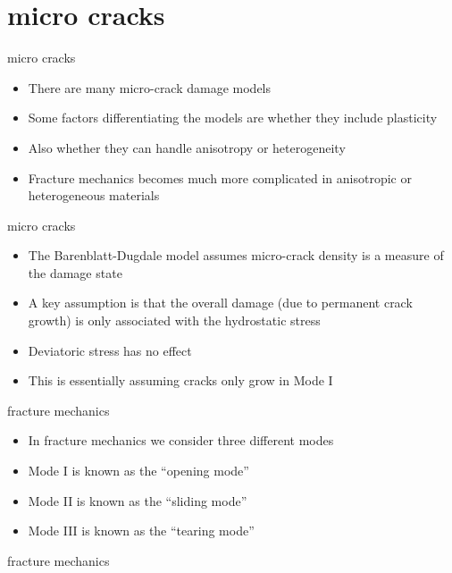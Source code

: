 \documentclass[
  letterpaper,
  ignorenonframetext,
  aspectratio=43,
  handout,
  12pt]{beamer}
\providecommand{\tightlist}{%
  \setlength{\itemsep}{0pt}\setlength{\parskip}{0pt}}
\providecommand{\tightlist}{%
\setlength{\itemsep}{0pt}\setlength{\parskip}{0pt}}
\begin{document}
\hypertarget{micro-cracks}{%
\section{micro cracks}\label{micro-cracks}}

\begin{frame}{micro cracks}
\protect\hypertarget{micro-cracks-1}{}
\begin{itemize}
\tightlist
\item
  There are many micro-crack damage models
\item
  Some factors differentiating the models are whether they include
  plasticity
\item
  Also whether they can handle anisotropy or heterogeneity
\item
  Fracture mechanics becomes much more complicated in anisotropic or
  heterogeneous materials
\end{itemize}
\end{frame}

\begin{frame}{micro cracks}
\protect\hypertarget{micro-cracks-2}{}
\begin{itemize}
\tightlist
\item
  The Barenblatt-Dugdale model assumes micro-crack density is a measure
  of the damage state
\item
  A key assumption is that the overall damage (due to permanent crack
  growth) is only associated with the hydrostatic stress
\item
  Deviatoric stress has no effect
\item
  This is essentially assuming cracks only grow in Mode I
\end{itemize}
\end{frame}

\begin{frame}{fracture mechanics}
\protect\hypertarget{fracture-mechanics}{}
\begin{itemize}
\tightlist
\item
  In fracture mechanics we consider three different modes
\item
  Mode I is known as the ``opening mode''
\item
  Mode II is known as the ``sliding mode''
\item
  Mode III is known as the ``tearing mode''
\end{itemize}
\end{frame}

\begin{frame}{fracture mechanics}
\protect\hypertarget{fracture-mechanics-1}{}
\end{frame}
\end{document}
